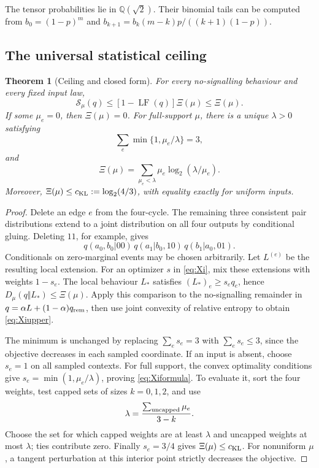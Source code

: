 \documentclass[11pt]{amsart}
\newtheorem{theorem}{Theorem}[section]
\theoremstyle{remark}
\theoremstyle{plain}
\numberwithin{equation}{section}
\DeclareMathOperator{\LF}{LF}
\newcommand{\cKL}{c_{\rm KL}}
\begin{document}
The tensor probabilities lie in \(\mathbb Q(\sqrt2)\).
Their binomial tails can be computed from
\(b_0=(1-p)^m\) and
\(b_{k+1}=b_k(m-k)p/((k+1)(1-p))\).

\subsection{The universal statistical ceiling}

\begin{theorem}[Ceiling and closed form]\label{thm:Xi}
For every no-signalling behaviour and every fixed input law,
\begin{equation}\label{eq:Xiupper}
 \mathcal S_\mu(q)\le[1-\LF(q)]\Xi(\mu)\le\Xi(\mu).
\end{equation}
If some \(\mu_e=0\), then \(\Xi(\mu)=0\).
For full-support \(\mu\), there is a unique \(\lambda>0\) satisfying
\[
 \sum_e\min\{1,\mu_e/\lambda\}=3,
\]
and
\begin{equation}\label{eq:Xiformula}
 \Xi(\mu)=\sum_{\mu_e<\lambda}
             \mu_e\log_2(\lambda/\mu_e).
\end{equation}
Moreover,
\(\Xi(\mu)\le\cKL:=\log_2(4/3)\), with equality exactly for uniform
inputs.
\end{theorem}

\begin{proof}
Delete an edge \(e\) from the four-cycle.
The remaining three consistent pair distributions extend to a joint
distribution on all four outputs by conditional gluing. Deleting
\(11\), for example, gives
\[
 q(a_0,b_0|00)\,q(a_1|b_0,10)\,q(b_1|a_0,01).
\]
Conditionals on zero-marginal events may be chosen arbitrarily.
Let \(L^{(e)}\) be the resulting local extension.
For an optimizer \(s\) in \eqref{eq:Xi}, mix these extensions with
weights \(1-s_e\). The local behaviour \(L_*\) satisfies
\((L_*)_e\ge s_eq_e\), hence
\(D_\mu(q\Vert L_*)\le\Xi(\mu)\).
Apply this comparison to the no-signalling remainder in
\(q=\alpha L+(1-\alpha)q_{\rm rem}\), then use joint convexity of
relative entropy to obtain \eqref{eq:Xiupper}.

The minimum is unchanged by replacing \(\sum_es_e=3\) with
\(\sum_es_e\le3\), since the objective decreases in each sampled
coordinate. If an input is absent, choose \(s_e=1\) on all sampled
contexts. For full support, the convex optimality conditions give
\(s_e=\min(1,\mu_e/\lambda)\), proving \eqref{eq:Xiformula}.
To evaluate it, sort the four weights, test capped sets of sizes
\(k=0,1,2\), and use
\[
 \lambda=\frac{\sum_{\rm uncapped}\mu_e}{3-k}.
\]
Choose the set for which capped weights are at least \(\lambda\)
and uncapped weights at most \(\lambda\); ties contribute zero.
Finally \(s_e=3/4\) gives \(\Xi(\mu)\le\cKL\).
For nonuniform \(\mu\), a tangent perturbation at this interior point
strictly decreases the objective.
\end{proof}
\end{document}
